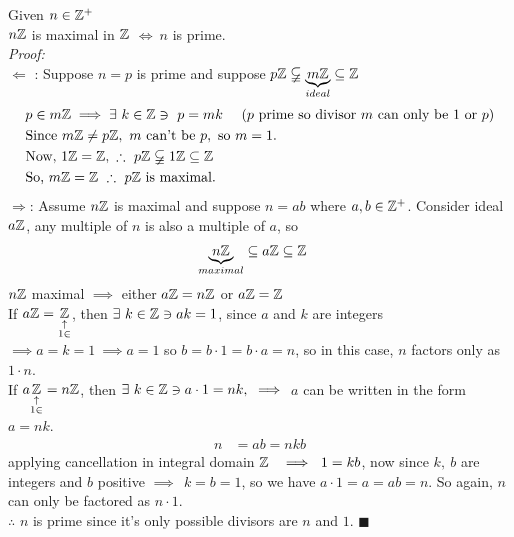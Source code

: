 \begin{proposition}
    Given $n\in {\mathbb{Z}}^{+}$ \\ $n{\mathbb{Z}}$ is maximal in ${\mathbb{Z}}$ $\iff \ n$ is prime. \\
    \textit{Proof: } \\ \steezybreak
    $\Leftarrow$ : Suppose $n=p$ is prime and suppose
    $p{\mathbb{Z}} \varsubsetneqq \underbrace{m{\mathbb{Z}}}_{ideal} \subseteq {\mathbb{Z}}$
    \begin{align}
        &p\in m\Z \implies \exists \ k \in \Z \ni \ p=mk \ \ \ \ (p\text{ prime so divisor } m \text{ can only be }1 \text{ or }p) \nonumber \\
        &\text{Since }m\Z \neq p\Z, \ m\text{ can't be }p, \text{ so }m=1. \nonumber \\
        & \text{Now, }1\Z=\Z, \ \therefore \ p\Z \varsubsetneqq 1\Z \subseteq \Z \nonumber \\
        &\text{So, }m\Z=\Z \ \therefore \ p\Z \text{ is maximal.} \nonumber
    \end{align}
    $\Rightarrow$: Assume $n{\mathbb{Z}}$ is maximal and suppose $n=ab$ where $a,b\in {\mathbb{Z}}^{+}$. Consider ideal
    $a{\mathbb{Z}}$, any multiple of $n$ is also a multiple of $a$, so
    \begin{align}
        \underbrace{n{\mathbb{Z}}}_{maximal} &\subseteq a{\mathbb{Z}} \subseteq {\mathbb{Z}} \nonumber
    \end{align}
    $n{\mathbb{Z}}$ maximal $\implies$ either $a{\mathbb{Z}}=n{\mathbb{Z}}$ or $a{\mathbb{Z}}={\mathbb{Z}}$ \\ \steezybreak
    If $a{\mathbb{Z}}=\underset{\substack{\uparrow \\ 1\in }}{{\mathbb{Z}}}$, then $\exists \ k\in {\mathbb{Z}} \ni ak = 1$, since
    $a$ and $k$ are integers $\implies a=k=1 \ \implies a=1$ so $b=b\cdot 1 = b\cdot a = n$, so in
    this case, $n$ factors only as $1\cdot n$. \\ \steezybreak
    If $a \underset{\substack{\uparrow \\ 1 \in}}{{\mathbb{Z}}} = n{\mathbb{Z}}$, then
    $\exists \ k\in {\mathbb{Z}} \ni a\cdot 1 =nk, \ \implies$ $a$ can be written in the form $a=nk$.
    \begin{align}
        n&= ab = nkb \nonumber
    \end{align}
    applying cancellation in integral domain $\Z \ \ \implies \ 1=kb$, now since $k,\ b$ are
    integers and $b$ positive $\implies \ \ k=b=1$, so we have $a\cdot 1 = a = ab=n$. So again, $n$
    can only be factored as $n\cdot 1$. \\ \steezybreak
    $\therefore$ $ n$ is prime since it's only possible divisors are $n$ and $1$. $\blacksquare$
\end{proposition}

